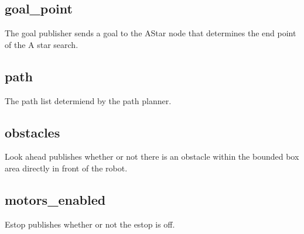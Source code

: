 \subsection{goal\_point}
The goal publisher sends a goal to the AStar node that determines the end point of the A star search.
\subsection{path}
The path list determiend by the path planner.
\subsection{obstacles}
Look ahead publishes whether or not there is an obstacle within the bounded box area directly in front of the robot.
\subsection{motors\_enabled}
Estop publishes whether or not the estop is off.
